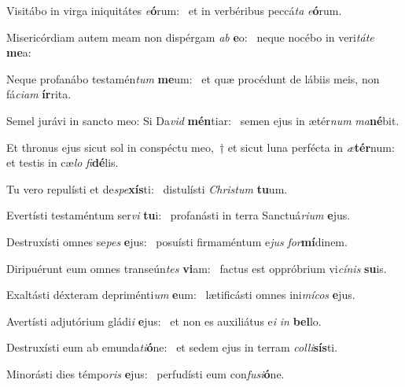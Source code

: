 \item Visitábo in virga iniquitátes \textit{e}\textbf{ó}rum:~\psstar{} et in verbéribus peccá\textit{ta} \textit{e}\textbf{ó}rum.

\item Misericórdiam autem meam non dispérgam \textit{ab} \textbf{e}o:~\psstar{} neque nocébo in veri\textit{táte} \textbf{me}a:

\item Neque profanábo testamén\textit{tum} \textbf{me}um:~\psstar{} et quæ procédunt de lábiis meis, non fá\textit{ciam} \textbf{ír}rita.

\item Semel jurávi in sancto meo: Si Da\textit{vid} \textbf{mén}tiar:~\psstar{} semen ejus in ætér\textit{num} \textit{ma}\textbf{né}bit.

\item Et thronus ejus sicut sol in conspéctu meo,~† et sicut luna perfécta in \textit{æ}\textbf{tér}num:~\psstar{} et testis in cæ\textit{lo} \textit{fi}\textbf{dé}lis.

\item Tu vero repulísti et de\textit{spe}\textbf{xís}ti:~\psstar{} distulísti \textit{Christum} \textbf{tu}um.

\item Evertísti testaméntum ser\textit{vi} \textbf{tu}i:~\psstar{} profanásti in terra Sanctuá\textit{rium} \textbf{e}jus.

\item Destruxísti omnes se\textit{pes} \textbf{e}jus:~\psstar{} posuísti firmaméntum e\textit{jus} \textit{for}\textbf{mí}dinem.

\item Diripuérunt eum omnes transeún\textit{tes} \textbf{vi}am:~\psstar{} factus est oppróbrium vi\textit{cínis} \textbf{su}is.

\item Exaltásti déxteram depriménti\textit{um} \textbf{e}um:~\psstar{} lætificásti omnes ini\textit{mícos} \textbf{e}jus.

\item Avertísti adjutórium gládi\textit{i} \textbf{e}jus:~\psstar{} et non es auxiliátus e\textit{i} \textit{in} \textbf{bel}lo.

\item Destruxísti eum ab emunda\textit{ti}\textbf{ó}ne:~\psstar{} et sedem ejus in terram \textit{colli}\textbf{sís}ti.

\item Minorásti dies témpo\textit{ris} \textbf{e}jus:~\psstar{} perfudísti eum con\textit{fusi}\textbf{ó}ne.

